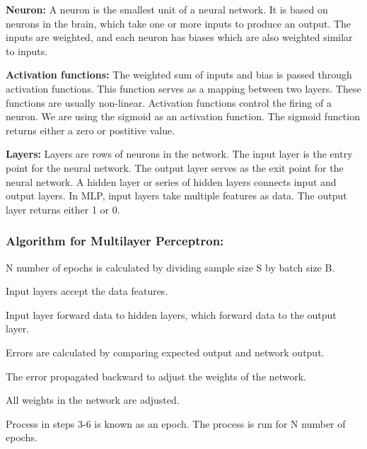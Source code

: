\vspace{-1em}
\textbf{Neuron:}
A neuron is the smallest unit of a neural network. It is based on neurons in the brain, which take one or more inputs to produce an output. The inputs are weighted, and each neuron has biases which are also weighted similar to inputs.

\vspace{-1em}
\textbf{Activation functions:}
The weighted sum of inputs and bias is passed through activation functions. This function serves as a mapping between two layers. These functions are usually non-linear. Activation functions control the firing of a neuron. We are using the sigmoid as an activation function. The sigmoid function returns either a zero or postitive value.

\vspace{-1em}
\textbf{Layers:}
Layers are rows of neurons in the network. The input layer is the entry point for the neural network. The output layer serves as the exit point for the neural network. A hidden layer or series of hidden layers connects input and output layers. In MLP, input layers take multiple
features as data. The output layer returns either 1 or 0.

\subsubsection{Algorithm for Multilayer Perceptron:}
\begin{steps}
  \vspace{-0.5em}
  \setlength{\itemsep}{-0.2em}
  \item N number of epochs is calculated by dividing sample size S by batch size B.
  \item Input layers accept the data features.
  \item Input layer forward data to hidden layers, which forward data to the output layer.
  \item Errors are calculated by comparing expected output and network output.
  \item The error propagated backward to adjust the weights of the network.
  \item All weights in the network are adjusted.
  \item Process in steps 3-6 is known as an epoch. The process is run for N number of epochs.
  \vspace{-1em}
\end{steps}

\vspace{-2em}
